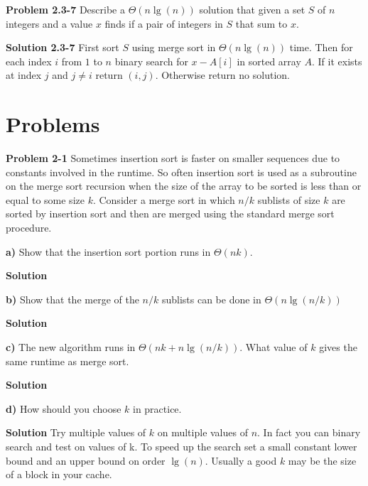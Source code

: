 \documentclass{article}
\begin{document}
\hrulefill

\medskip

\textbf{Problem 2.3-7} Describe a $\Theta(n\lg(n))$ solution that given a set $S$ of $n$ integers and a value $x$ finds if a pair of integers in $S$ that sum to $x$.

\medskip

\textbf{Solution 2.3-7} First sort $S$ using merge sort in $\Theta(n\lg(n))$ time. Then for each index $i$ from $1$ to $n$ binary search for $x - A[i]$ in sorted array $A$. If it exists at index $j$ and $j \neq i$ return $(i,j)$. Otherwise return no solution.

\hrulefill

\section*{Problems}

\hrulefill

\medskip

\textbf{Problem 2-1} Sometimes insertion sort is faster on smaller sequences due to constants involved in the runtime. So often insertion sort is used as a subroutine on the merge sort recursion when the size of the array to be sorted is less than or equal to some size $k$. Consider a merge sort in which $n/k$ sublists of size $k$ are sorted by insertion sort and then are merged using the standard merge sort procedure.

\textbf{a)} Show that the insertion sort portion runs in $\Theta(nk)$.

\medskip

\textbf{Solution}

\medskip

\textbf{b)} Show that the merge of the $n/k$ sublists can be done in $\Theta(n\lg(n/k))$

\medskip

\textbf{Solution}

\medskip

\textbf{c)} The new algorithm runs in $\Theta(nk + n\lg(n/k))$. What value of $k$ gives the same runtime as merge sort.

\medskip

\textbf{Solution}

\medskip

\textbf{d)} How should you choose $k$ in practice.

\medskip

\textbf{Solution} Try multiple values of $k$ on multiple values of $n$. In fact you can binary search and test on values of k. To speed up the search set a small constant lower bound and an upper bound on order $\lg(n)$. Usually a good $k$ may be the size of a block in your cache.
\end{document}
